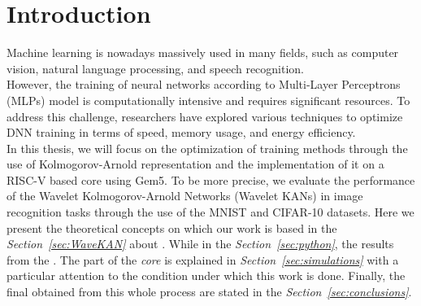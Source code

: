 \documentclass[11pt,a4paper,twocolumn]{article}
\begin{document}



\section{Introduction}
\label{sec:introduction}

Machine learning is nowadays massively used in many fields, such as computer vision, natural language processing, and speech recognition. 
\\
However, the training of neural networks according to Multi-Layer Perceptrons (MLPs) model is computationally intensive and requires significant resources. 
To address this challenge, researchers have explored various techniques to optimize DNN training in terms of speed, memory usage, and energy efficiency.
\\
In this thesis, we will focus on the optimization of training methods through the use of Kolmogorov-Arnold representation and the implementation of it on a RISC-V based core using Gem5.
To be more precise, we evaluate the performance of the Wavelet Kolmogorov-Arnold Networks (Wavelet KANs) in image recognition tasks through the use of the MNIST and CIFAR-10 datasets.
Here we present the theoretical concepts on which our work is based in the \textit{Section~\ref{sec:WaveKAN}} about \textit{}. While in the \textit{Section~\ref{sec:python}}, the results from the \textit{}. 
The part of the \textit{ core} is explained in \textit{Section~\ref{sec:simulations}} with a particular attention to the condition under which this work is done.
Finally, the final  \textit{} obtained from this whole process are stated in the \textit{Section~\ref{sec:conclusions}}.
\end{document}

